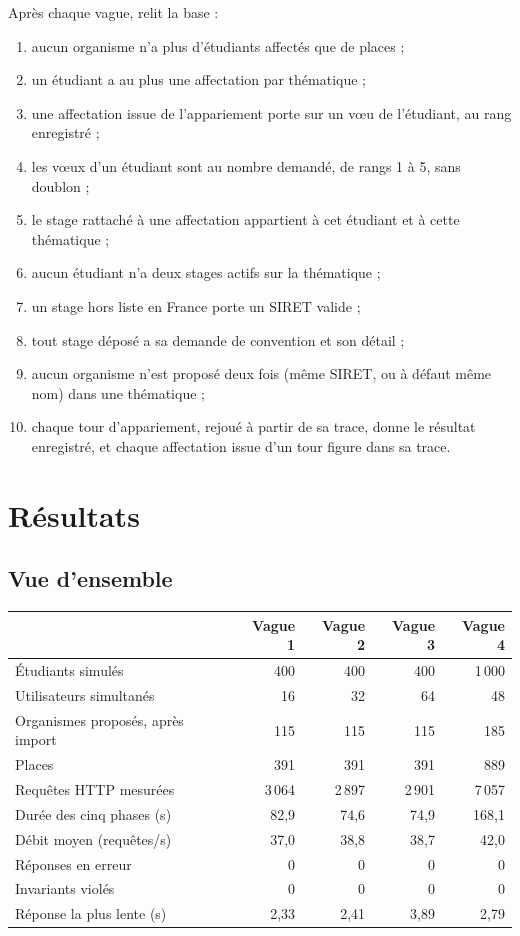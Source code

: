 \documentclass[11pt,a4paper]{article}
\newcommand{\code}[1]{\texttt{\detokenize{#1}}}
\begin{document}
Après chaque vague, \code{check.php} relit la base :

\begin{enumerate}
  \item aucun organisme n'a plus d'étudiants affectés que de places ;
  \item un étudiant a au plus une affectation par thématique ;
  \item une affectation issue de l'appariement porte sur un vœu de l'étudiant, au rang enregistré ;
  \item les vœux d'un étudiant sont au nombre demandé, de rangs 1 à 5, sans doublon ;
  \item le stage rattaché à une affectation appartient à cet étudiant et à cette thématique ;
  \item aucun étudiant n'a deux stages actifs sur la thématique ;
  \item un stage hors liste en France porte un SIRET valide ;
  \item tout stage déposé a sa demande de convention et son détail ;
  \item aucun organisme n'est proposé deux fois (même SIRET, ou à défaut même nom) dans une
    thématique ;
  \item chaque tour d'appariement, rejoué à partir de sa trace, donne le résultat enregistré, et
    chaque affectation issue d'un tour figure dans sa trace.
\end{enumerate}

\section{Résultats}

\subsection{Vue d'ensemble}

\begin{center}
\begin{tabularx}{\linewidth}{@{}X r r r r@{}}
\toprule
& \textbf{Vague 1} & \textbf{Vague 2} & \textbf{Vague 3} & \textbf{Vague 4} \\
\midrule
Étudiants simulés & 400 & 400 & 400 & 1\,000 \\
Utilisateurs simultanés & 16 & 32 & 64 & 48 \\
Organismes proposés, après import & 115 & 115 & 115 & 185 \\
Places & 391 & 391 & 391 & 889 \\
Requêtes HTTP mesurées & 3\,064 & 2\,897 & 2\,901 & 7\,057 \\
Durée des cinq phases (s) & 82{,}9 & 74{,}6 & 74{,}9 & 168{,}1 \\
Débit moyen (requêtes/s) & 37{,}0 & 38{,}8 & 38{,}7 & 42{,}0 \\
Réponses en erreur & 0 & 0 & 0 & 0 \\
Invariants violés & 0 & 0 & 0 & 0 \\
Réponse la plus lente (s) & 2{,}33 & 2{,}41 & 3{,}89 & 2{,}79 \\
\bottomrule
\end{tabularx}
\end{center}
\end{document}
